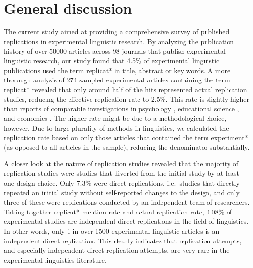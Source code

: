 \documentclass[cm,linguex]{glossa}
\begin{document}
\hypertarget{general-discussion}{%
\section{General discussion}\label{general-discussion}}

The current study aimed at providing a comprehensive survey of published replications in experimental linguistic research.
By analyzing the publication history of over 50000 articles across 98 journals that publish experimental linguistic research, our study found that 4.5\% of experimental linguistic publications used the term replicat* in title, abstract or key words.
A more thorough analysis of 274 sampled experimental articles containing the term replicat* revealed that only around half of the hits represented actual replication studies, reducing the effective replication rate to 2.5\%. This rate is slightly higher than reports of comparable investigations in psychology \citep[1.6\%,][]{makel_replications_2012}, educational science \citep[0.1\%,][]{makel_facts_2014}, and economics \citep[0.1\%,][]{mueller2019replication}. The higher rate might be due to a methodological choice, however. Due to large plurality of methods in linguistics, we calculated the replication rate based on only those articles that contained the term experiment* (as opposed to all articles in the sample), reducing the denominator substantially.

A closer look at the nature of replication studies revealed that the majority of replication studies were studies that diverted from the initial study by at least one design choice. Only 7.3\% were direct replications, i.e.~studies that directly repeated an initial study without self-reported changes to the design, and only three of these were replications conducted by an independent team of researchers.
Taking together replicat* mention rate and actual replication rate, 0.08\% of experimental studies are independent direct replications in the field of linguistics. In other words, only 1 in over 1500 experimental linguistic articles is an independent direct replication. This clearly indicates that replication attempts, and especially independent direct replication attempts, are very rare in the experimental linguistics literature.
\end{document}
